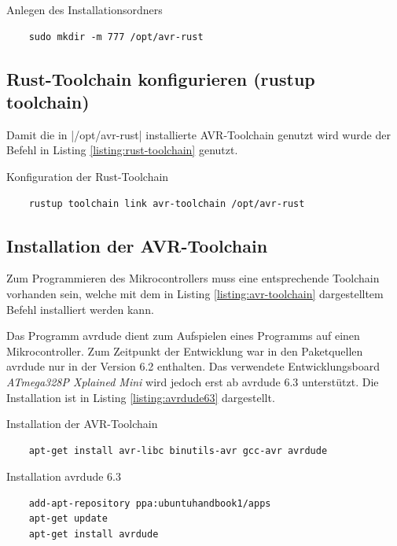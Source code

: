 \documentclass
[ 12pt,
  parskip=half %
]{scrreprt}
\newenvironment{mylisting}[1][H]
{\captionsetup{aboveskip=-0.2\normalbaselineskip}\begin{listing}[#1]}
{\end{listing}}
\begin{document}
\begin{mylisting}
	\caption{Anlegen des Installationsordners}
	\label{listing:installationsordner}
	\begin{verbatim}
	sudo mkdir -m 777 /opt/avr-rust
	\end{verbatim}
\end{mylisting}

\subsection{Rust-Toolchain konfigurieren (rustup toolchain)}

Damit die in \bashinline|/opt/avr-rust| installierte AVR-Toolchain genutzt wird wurde der Befehl in Listing \ref{listing:rust-toolchain} genutzt.

\begin{mylisting}
	\caption{Konfiguration der Rust-Toolchain}
	\label{listing:rust-toolchain}
	\begin{verbatim}
	rustup toolchain link avr-toolchain /opt/avr-rust
	\end{verbatim}
\end{mylisting}

\subsection{Installation der AVR-Toolchain}

Zum Programmieren des Mikrocontrollers muss eine entsprechende Toolchain vorhanden sein, welche mit dem in Listing \ref{listing:avr-toolchain} dargestelltem Befehl installiert werden kann.

Das Programm avrdude dient zum Aufspielen eines Programms auf einen Mikrocontroller. Zum Zeitpunkt der Entwicklung war in den Paketquellen avrdude nur in der Version 6.2 enthalten. Das verwendete Entwicklungsboard \textit{ATmega328P Xplained Mini} wird jedoch erst ab avrdude 6.3 unterstützt. Die Installation ist in Listing \ref{listing:avrdude63} dargestellt.

\begin{mylisting}
	\caption{Installation der AVR-Toolchain}
	\label{listing:avr-toolchain}
	\begin{verbatim}
	apt-get install avr-libc binutils-avr gcc-avr avrdude
	\end{verbatim}
\end{mylisting}

\begin{mylisting}
	\caption{Installation avrdude 6.3}
	\label{listing:avrdude63}
	\begin{verbatim}
	add-apt-repository ppa:ubuntuhandbook1/apps
	apt-get update
	apt-get install avrdude
	\end{verbatim}
\end{mylisting}
\end{document}
